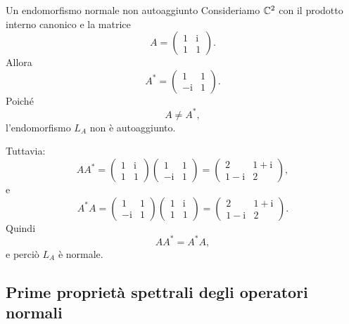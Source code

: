 \documentclass[a4paper]{article}
\begin{document}
\begin{snippetexample}{Un endomorfismo normale non autoaggiunto}
    Consideriamo \(\mathbb{C}^2\) con il prodotto interno canonico e la matrice
    \[
        A=
        \begin{pmatrix}
            1 & \mathrm{i}\\
            1 & 1
        \end{pmatrix}.
    \]
    Allora
    \[
        A^*=
        \begin{pmatrix}
            1 & 1\\
            -\mathrm{i} & 1
        \end{pmatrix}.
    \]
    Poiché
    \[
        A\neq A^*,
    \]
    l'endomorfismo \(L_A\) non è autoaggiunto.

    Tuttavia:
    \[
        AA^*
        =
        \begin{pmatrix}
            1 & \mathrm{i}\\
            1 & 1
        \end{pmatrix}
        \begin{pmatrix}
            1 & 1\\
            -\mathrm{i} & 1
        \end{pmatrix}
        =
        \begin{pmatrix}
            2 & 1+\mathrm{i}\\
            1-\mathrm{i} & 2
        \end{pmatrix},
    \]
    e
    \[
        A^*A
        =
        \begin{pmatrix}
            1 & 1\\
            -\mathrm{i} & 1
        \end{pmatrix}
        \begin{pmatrix}
            1 & \mathrm{i}\\
            1 & 1
        \end{pmatrix}
        =
        \begin{pmatrix}
            2 & 1+\mathrm{i}\\
            1-\mathrm{i} & 2
        \end{pmatrix}.
    \]
    Quindi
    \[
        AA^*=A^*A,
    \]
    e perciò \(L_A\) è normale.
\end{snippetexample}

\subsection{Prime proprietà spettrali degli operatori normali}
\end{document}
